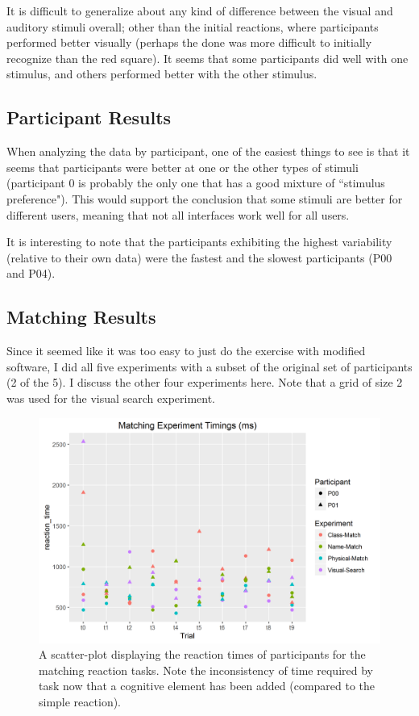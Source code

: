 \documentclass{article}
\begin{document}
It is difficult to generalize about any kind of difference between the visual and auditory stimuli overall; other than the initial reactions, where participants performed better visually (perhaps the done was more difficult to initially recognize than the red square). It seems that some participants did well with one stimulus, and others performed better with the other stimulus.

%
\subsection{Participant Results}
When analyzing the data by participant, one of the easiest things to see is that it seems that participants were better at one or the other types of stimuli (participant $0$ is probably the only one that has a good mixture of ``stimulus preference"). This would support the conclusion that some stimuli are better for different users, meaning that not all interfaces work well for all users.

It is interesting to note that the participants exhibiting the highest variability (relative to their own data) were the fastest and the slowest participants (P00 and P04).

%
\subsection{Matching Results}
Since it seemed like it was too easy to just do the exercise with modified software, I did all five experiments with a subset of the original set of participants (2 of the 5). I discuss the other four experiments here. Note that a grid of size 2 was used for the visual search experiment.

\begin{figure}[h!]
\centering
\includegraphics[width=.65\linewidth]{matching-timings}
\caption{A scatter-plot displaying the reaction times of participants for the matching reaction tasks. Note the inconsistency of time required by task now that a cognitive element has been added (compared to the simple reaction).}
\label{fig:matching-timings}
\end{figure}
\end{document}

